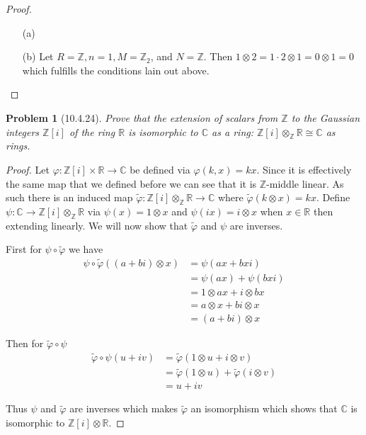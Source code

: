 \documentclass[10pt]{article}
\newcommand{\sk}{\vskip 10mm}
\newcommand{\bb}[1]{\mathbb{#1}}
\newcommand{\wt}[1]{\widetilde{#1}}
\theoremstyle{plain}
\newtheorem{problem}{Problem}
\theoremstyle{remark}
\begin{document}
\begin{proof}
  \begin{enumerate}
  \item[(a)]
  \item[(b)] Let $R=\bb{Z},n=1,M=\bb{Z}_2$, and $N=\bb{Z}$. Then $1\otimes 2=1\cdot 2\otimes 1=0\otimes 1=0$
    which fulfills the conditions lain out above.
  \end{enumerate}
\end{proof}

\sk

\begin{problem}[10.4.24]
  Prove that the extension of scalars from $\bb{Z}$ to the Gaussian integers
  $\bb{Z}[i]$ of the ring $\bb{R}$ is isomorphic to $\bb{C}$ as a ring:
  $\bb{Z}[i]\otimes_{\bb{Z}}\bb{R}\cong\bb{C}$ as rings.
\end{problem}

\begin{proof}
  Let $\varphi:\bb{Z}[i]\times\bb{R}\rightarrow \bb{C}$ be defined via $\varphi(k,x)=kx$. Since it
  is effectively the same map that we defined before we can see that it
  is $\bb{Z}$-middle linear. As such there is an induced map
  $\wt{\varphi}:\bb{Z}[i]\otimes_{\bb{Z}}\bb{R}\rightarrow\bb{C}$ where $\wt{\varphi}(k\otimes x)=kx$.
  Define $\psi:\bb{C}\rightarrow \bb{Z}[i]\otimes_{\bb{Z}}\bb{R}$ via $\psi(x)=1\otimes x$ and $\psi(ix)=i\otimes x$
  when $x\in \bb{R}$ then extending linearly. We will now show that $\wt{\varphi}$ and
  $\psi$ are inverses.

  First for $\psi\circ\wt{\varphi}$ we have
  \begin{align*}
    \psi\circ\wt{\varphi}((a+bi)\otimes x) &= \psi(ax+bxi)\\
                        &= \psi(ax)+\psi(bxi)\\
                        &= 1\otimes ax + i\otimes bx\\
                        &= a\otimes x + bi\otimes x\\
                        &= (a+bi)\otimes x
  \end{align*}

  Then for $\wt{\varphi}\circ\psi$
  \begin{align*}
    \wt{\varphi}\circ\psi(u+iv) &= \wt{\varphi}(1\otimes u+i\otimes v)\\
                   &= \wt{\varphi}(1\otimes u)+\wt{\varphi}(i\otimes v)\\
                   &= u+iv
  \end{align*}

  Thus $\psi$ and $\wt{\varphi}$ are inverses which makes $\wt{\varphi}$ an isomorphism
  which shows that $\bb{C}$ is isomorphic to $\bb{Z}[i]\otimes \bb{R}$.
\end{proof}
\end{document}
